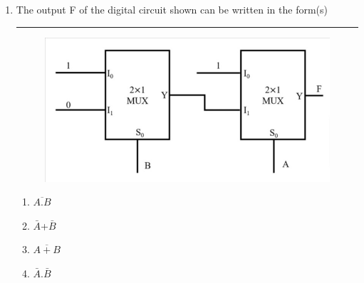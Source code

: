 \documentclass{article}
\begin{document}
\begin{enumerate}
    \item The output F of the digital circuit shown can be written in the form(s)\rule{2cm}{0.5pt}
    \begin{figure}[h]
        \centering
        \includegraphics[width=\columnwidth]{gate.jpg}
        \caption{}
        \label{fig:my_label}
    \end{figure}
    \begin{enumerate}
        \item $\overline{A.B}$
        \item $\bar{A}$+$\bar{B}$
        \item $\overline{A + B}$
        \item $\bar{A}$.$\bar{B}$
    \end{enumerate}
\end{enumerate}
\end{document}
